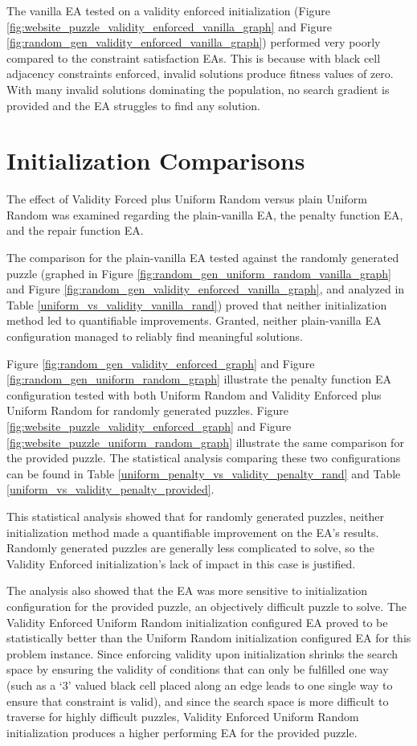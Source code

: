 \documentclass[11pt]{article}
\begin{document}
The vanilla EA tested on a validity enforced initialization (Figure \ref{fig:website_puzzle_validity_enforced_vanilla_graph} 
and Figure \ref{fig:random_gen_validity_enforced_vanilla_graph}) performed very poorly compared to the constraint satisfaction EAs.
This is because with black cell adjacency constraints enforced, invalid solutions produce fitness values of zero. With many invalid solutions
dominating the population, no search gradient is provided and the EA struggles to find any solution.


\section{Initialization Comparisons}

The effect of Validity Forced plus Uniform Random versus plain Uniform Random was examined
regarding the plain-vanilla EA, the penalty function EA, and the repair function EA.

The comparison for the plain-vanilla EA tested against the randomly generated puzzle
(graphed in Figure \ref{fig:random_gen_uniform_random_vanilla_graph}
and Figure \ref{fig:random_gen_validity_enforced_vanilla_graph}, and analyzed in Table \ref{uniform_vs_validity_vanilla_rand})
proved that neither initialization method led to quantifiable improvements. Granted, neither plain-vanilla EA configuration
managed to reliably find meaningful solutions.

Figure \ref{fig:random_gen_validity_enforced_graph} and Figure \ref{fig:random_gen_uniform_random_graph} 
illustrate the penalty function EA configuration tested with both Uniform Random and 
Validity Enforced plus Uniform Random for randomly generated puzzles. Figure \ref{fig:website_puzzle_validity_enforced_graph} 
and Figure \ref{fig:website_puzzle_uniform_random_graph} illustrate
the same comparison for the provided puzzle. The statistical analysis comparing these two 
configurations can be found in Table \ref{uniform_penalty_vs_validity_penalty_rand} and Table \ref{uniform_vs_validity_penalty_provided}.

This statistical analysis showed that for randomly generated puzzles, neither initialization method
made a quantifiable improvement on the EA's results. Randomly generated puzzles are generally less
complicated to solve, so the Validity Enforced initialization's lack of impact in this case is justified.

The analysis also showed that the EA was more sensitive to initialization configuration
for the provided puzzle, an objectively difficult puzzle to solve. The Validity Enforced Uniform Random
initialization configured EA proved to be statistically better than the Uniform Random initialization
configured EA for this problem instance. Since enforcing validity upon initialization shrinks the search space by ensuring the validity
of conditions that can only be fulfilled one way (such as a `3' valued black cell placed along an edge leads to one single way to
ensure that constraint is valid), and since the search space is more difficult to traverse for 
highly difficult puzzles, Validity Enforced Uniform Random initialization produces a higher performing EA for 
the provided puzzle.
\end{document}
